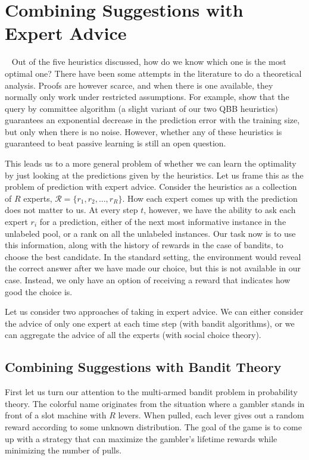 \documentclass[fleqn,10pt,lineno]{wlpeerj} %
\newcommand{\R}{\mathcal{R}}
\begin{document}
\section{Combining Suggestions with Expert Advice}~\label{sec:expert}
Out of the five heuristics discussed, how do we know which one is the most
optimal one? There have been some attempts in the literature to do a
theoretical analysis. Proofs are however scarce, and when there is one
available, they normally only work under restricted assumptions. For example,
\cite{freund97} show that the query by committee algorithm (a slight variant of
our two QBB heuristics) guarantees an exponential decrease in the prediction
error with the training size, but only when there is no noise. However, whether
any of these heuristics is guaranteed to beat passive learning is still an open
question.

This leads us to a more general problem of whether we can learn the optimality
by just looking at the predictions given by the heuristics. Let us frame this
as the problem of prediction with expert advice. Consider the heuristics as a
collection of $R$ experts, $\R = \{r_1, r_2, ..., r_R\}$. How each expert comes up
with the prediction does not matter to us. At every step $t$, however, we have
the ability to ask each expert $r_i$ for a prediction, either of the next most
informative instance in the unlabeled pool, or a rank on all the unlabeled
instances. Our task now is to use this information, along with the history of
rewards in the case of bandits, to choose the best candidate. In the standard
setting, the environment would reveal the correct answer after we have made our
choice, but this is not available in our case. Instead, we only have an option
of receiving a reward that indicates how good the choice is.

Let us consider two approaches of taking in expert advice. We can either
consider the advice of only one expert at each time step (with bandit
algorithms), or we can aggregate the advice of all the experts (with social
choice theory).

\subsection{Combining Suggestions with Bandit Theory}

First let us turn our attention to the multi-armed bandit problem in
probability theory. The colorful name originates from the situation where a
gambler stands in front of a slot machine with $R$ levers. When pulled, each
lever gives out a random reward according to some unknown distribution. The
goal of the game is to come up with a strategy that can maximize the gambler's
lifetime rewards while minimizing the number of pulls.
\end{document}
